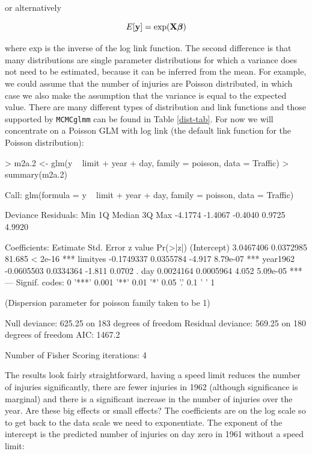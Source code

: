 \documentclass{article}
\begin{document}
or alternatively

\begin{equation}
E[{\bf y}] = \textrm{exp}({\bf X}{\bm \beta})
\end{equation}

where \textrm{exp} is the inverse of the log link function. The second difference is that many distributions are single parameter distributions for which a variance does not need to be estimated, because it can be inferred from the mean. For example, we could assume that the number of injuries are Poisson distributed, in which case we also make the assumption that the variance is equal to the expected value.  There are many different types of distribution and link functions and those supported by \texttt{MCMCglmm} can be found in Table \ref{dist-tab}. For now we will concentrate on a Poisson GLM with log link (the default link function for the Poisson distribution):

\begin{Schunk}
\begin{Sinput}
> m2a.2 <- glm(y ~ limit + year + day, family = poisson, data = Traffic)
> summary(m2a.2)
\end{Sinput}
\begin{Soutput}
Call:
glm(formula = y ~ limit + year + day, family = poisson, data = Traffic)

Deviance Residuals: 
    Min       1Q   Median       3Q      Max  
-4.1774  -1.4067  -0.4040   0.9725   4.9920  

Coefficients:
              Estimate Std. Error z value Pr(>|z|)    
(Intercept)  3.0467406  0.0372985  81.685  < 2e-16 ***
limityes    -0.1749337  0.0355784  -4.917 8.79e-07 ***
year1962    -0.0605503  0.0334364  -1.811   0.0702 .  
day          0.0024164  0.0005964   4.052 5.09e-05 ***
---
Signif. codes:  0 '***' 0.001 '**' 0.01 '*' 0.05 '.' 0.1 ' ' 1 

(Dispersion parameter for poisson family taken to be 1)

    Null deviance: 625.25  on 183  degrees of freedom
Residual deviance: 569.25  on 180  degrees of freedom
AIC: 1467.2

Number of Fisher Scoring iterations: 4
\end{Soutput}
\end{Schunk}

The results look fairly straightforward, having a speed limit reduces the number of injuries significantly, there are fewer injuries in 1962 (although significance is marginal) and there is a significant increase in the number of injuries over the year. Are these big effects or small effects? The coefficients are on the log scale so to get back to the data scale we need to exponentiate. The exponent of the intercept is the predicted number of injuries on day zero in 1961 without a speed limit:
\end{document}
